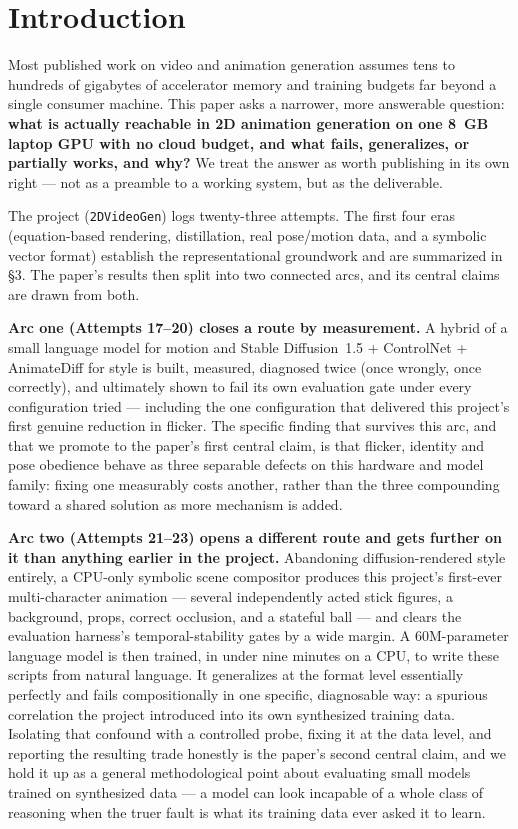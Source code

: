 \documentclass[11pt]{article}
\newcommand{\secsym}{\S}
\begin{document}
\section{Introduction}
\label{sec:intro}

Most published work on video and animation generation assumes tens to
hundreds of gigabytes of accelerator memory and training budgets far
beyond a single consumer machine. This paper asks a narrower, more
answerable question: \textbf{what is actually reachable in 2D animation
generation on one 8~GB laptop GPU with no cloud budget, and what fails,
generalizes, or partially works, and why?} We treat the answer as worth
publishing in its own right --- not as a preamble to a working system, but
as the deliverable.

The project (\texttt{2DVideoGen}) logs twenty-three attempts. The first
four eras (equation-based rendering, distillation, real pose/motion data,
and a symbolic vector format) establish the representational groundwork
and are summarized in \secsym3. The paper's results then split into two
connected arcs, and its central claims are drawn from both.

\textbf{Arc one (Attempts 17--20) closes a route by measurement.} A hybrid
of a small language model for motion and Stable Diffusion~1.5 + ControlNet
+ AnimateDiff for style is built, measured, diagnosed twice (once wrongly,
once correctly), and ultimately shown to fail its own evaluation gate
under every configuration tried --- including the one configuration that
delivered this project's first genuine reduction in flicker. The specific
finding that survives this arc, and that we promote to the paper's first
central claim, is that flicker, identity and pose obedience behave as
three separable defects on this hardware and model family: fixing one
measurably costs another, rather than the three compounding toward a
shared solution as more mechanism is added.

\textbf{Arc two (Attempts 21--23) opens a different route and gets
further on it than anything earlier in the project.} Abandoning
diffusion-rendered style entirely, a CPU-only symbolic scene compositor
produces this project's first-ever multi-character animation --- several
independently acted stick figures, a background, props, correct
occlusion, and a stateful ball --- and clears the evaluation harness's
temporal-stability gates by a wide margin. A 60M-parameter language model
is then trained, in under nine minutes on a CPU, to write these scripts
from natural language. It generalizes at the format level essentially
perfectly and fails compositionally in one specific, diagnosable way: a
spurious correlation the project introduced into its own synthesized
training data. Isolating that confound with a controlled probe, fixing it
at the data level, and reporting the resulting trade honestly is the
paper's second central claim, and we hold it up as a general
methodological point about evaluating small models trained on synthesized
data --- a model can look incapable of a whole class of reasoning when the
truer fault is what its training data ever asked it to learn.
\end{document}
